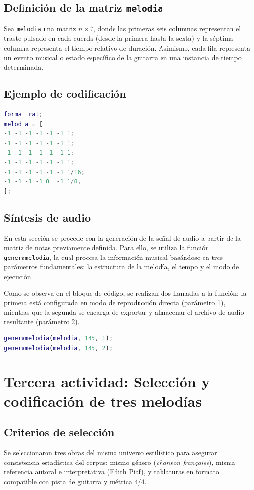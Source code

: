 \documentclass{article}
\theoremstyle{plain}
\theoremstyle{definition}
\begin{document}
\subsection*{Definición de la matriz \texttt{melodia}}

Sea \texttt{melodia} una matriz $n \times 7$, donde las primeras seis columnas representan el traste pulsado en cada cuerda (desde la primera hasta la sexta) y la séptima columna representa el tiempo relativo de duración. Asimismo, cada fila representa un evento musical o estado específico de la guitarra en una instancia de tiempo determinada.

\subsection*{Ejemplo de codificación}
\begin{lstlisting}[language=Matlab]
format rat;
melodia = [
-1 -1 -1 -1 -1 -1 1;
-1 -1 -1 -1 -1 -1 1;
-1 -1 -1 -1 -1 -1 1;
-1 -1 -1 -1 -1 -1 1;
-1 -1 -1 -1 -1 -1 1/16;
-1 -1 -1 -1 8  -1 1/8;
];
\end{lstlisting}

\subsection*{Síntesis de audio}

En esta sección se procede con la generación de la señal de audio a partir de la matriz de notas previamente definida. Para ello, se utiliza la función \texttt{generamelodia}, la cual procesa la información musical basándose en tres parámetros fundamentales: la estructura de la melodía, el tempo y el modo de ejecución.

Como se observa en el bloque de código, se realizan dos llamadas a la función: la primera está configurada en modo de reproducción directa (parámetro 1), mientras que la segunda se encarga de exportar y almacenar el archivo de audio resultante (parámetro 2).

\begin{lstlisting}[language=Matlab]
generamelodia(melodia, 145, 1);
generamelodia(melodia, 145, 2);
\end{lstlisting}

\section*{Tercera actividad: Selección y codificación de tres melodías}
\subsection*{Criterios de selección}
Se seleccionaron tres obras del mismo universo estilístico para asegurar consistencia estadística del corpus: mismo género (\textit{chanson française}), misma referencia autoral e interpretativa (Edith Piaf), y tablaturas en formato compatible con pista de guitarra y métrica \(4/4\).
\end{document}

